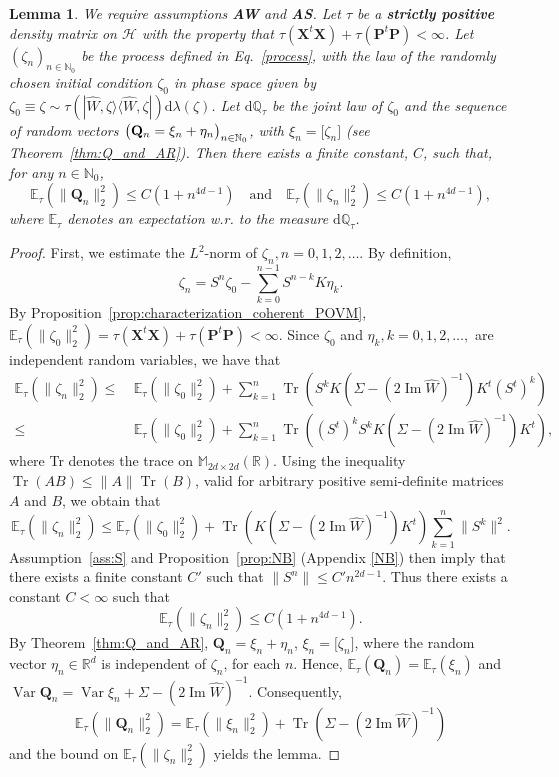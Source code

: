 \documentclass[12pt]{article}
\newtheorem{lemma}[theorem]{Lemma}
\newcommand{\Tr}{\operatorname{Tr}}
\newcommand{\ket}[1]{|{#1}\rangle}
\newcommand{\bra}[1]{\langle{#1}|}
\renewcommand{\Im}{\operatorname{Im}}
\renewcommand{\d}{{\mathrm d}}
\begin{document}
\begin{lemma}\label{lem:poly_bound_var}
We require assumptions {\bf{AW}} and {\bf{AS}}. Let $\tau$ be a {\bf{strictly positive}} density matrix on $\mathcal{H}$ with the property that \mbox{$\tau(\mathbf X^t\mathbf X)+\tau(\mathbf P^t\mathbf P)<\infty$.} Let $(\zeta_n)_{n\in\mathbb N_0}$ be the 
process defined in Eq.~\eqref{process}, with the law of the randomly chosen initial condition $\zeta_0$ 
in phase space given by 
$\zeta_0 \equiv \zeta \sim \tau(\ket{\widehat W,\zeta}\bra{\widehat W,\zeta})\d\lambda(\zeta)$. Let $\d \mathbb Q_\tau$ 
be the joint law of $\zeta_0$ and the sequence of random vectors $\big({\bf{Q}}_{n} = \xi_n+ \eta_n \big)_{n\in \mathbb N_0}$, 
with $\xi_n=\big[\zeta_n\big]$  (see Theorem~\ref{thm:Q_and_AR}). Then there exists a finite constant, $C$, such that, 
for any $n\in \mathbb N_0$,
	$$\mathbb E_\tau(\|\mathbf Q_n\|_2^2)\leq C(1+n^{4d-1})\quad \mbox{and} \quad \mathbb E_\tau(\|\zeta_n\|_2^2)\leq C(1+n^{4d-1}),$$
	where $\mathbb{E}_{\tau}$ denotes an expectation w.r. to the measure $\d \mathbb Q_\tau$.
\end{lemma}
\begin{proof}
	First, we estimate the $L^2$-norm of $\zeta_n, n=0,1,2,\dots$. By definition,
	$$\zeta_n= S^n\zeta_0-\sum_{k=0}^{n-1}S^{n-k}K\eta_k.$$
	By Proposition~\ref{prop:characterization_coherent_POVM}, 
	$\mathbb E_{\tau}(\|\zeta_0\|_2^2)=\tau(\mathbf X^t\mathbf X)+\tau(\mathbf P^t\mathbf P)<\infty$. Since $\zeta_0$ and 
	$\eta_k, k=0,1,2,\dots,$ are independent random variables, we have that
	\begin{align*}
	\mathbb E_{\tau} (\|\zeta_n\|_2^2)\leq\ &\mathbb E_{\tau}(\|\zeta_0\|_2^2)+\sum_{k=1}^{n}\Tr(S^{k}K(\Sigma- (2 \Im \widehat{W})^{-1}) K^t(S^t)^k)\\
	\leq\ &\mathbb E_{\tau}(\|\zeta_0\|_2^2)+\sum_{k=1}^{n}\Tr((S^t)^kS^{k}K(\Sigma- (2 \Im \widehat{W})^{-1}) K^t),
	\end{align*}
		where Tr denotes the trace on $\mathbb{M}_{2d\times 2d}(\mathbb{R})$.
	Using the inequality $\Tr(AB)\leq \|A\|\Tr(B)$, valid for arbitrary positive semi-definite matrices $A$ and $B$, we obtain that
	$$\mathbb E_{\tau} (\|\zeta_n\|_2^2)\leq\mathbb E_{\tau}(\|\zeta_0\|_2^2)+\Tr(K(\Sigma- (2 \Im \widehat{W})^{-1}) K^t)\sum_{k=1}^{n}\|S^k\|^{2}.$$
	Assumption~\ref{ass:S} and Proposition~\ref{prop:NB} (Appendix \ref{NB}) then imply that there exists a finite 
	constant $C'$ such that $\|S^n\|\leq C' n^{2d-1}$. Thus there exists a constant $C<\infty$ such that
	$$\mathbb E_{\tau} (\|\zeta_n\|_2^2)\leq C(1+n^{4d-1}).$$
	By Theorem~\ref{thm:Q_and_AR}, $\mathbf Q_n=\xi_n+\eta_n$, $\xi_n =\big[\zeta_n \big]$, where the random vector 
	$\eta_n \in \mathbb{R}^{d}$ is independent of $\zeta_n$, for each $n$. Hence, 
	$\mathbb E_{\tau}(\mathbf Q_n)=\mathbb E_{\tau}(\xi_n)$ and  
	$\operatorname{Var}\mathbf Q_n=\operatorname{Var}\xi_n +\Sigma-(2\Im\widehat W)^{-1}$. Consequently,
	$$\mathbb E_{\tau}(\|\mathbf Q_n\|_2^2)=\mathbb E_{\tau}(\|\xi_n\|_2^2)+\Tr(\Sigma-(2\Im \widehat W)^{-1})$$
	and the bound on $\mathbb E_{\tau}(\|\zeta_n\|_2^2)$ yields the lemma.
\end{proof}
\end{document}

